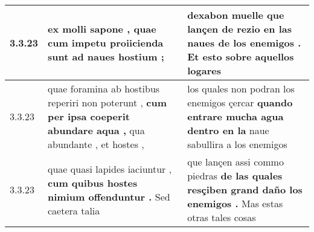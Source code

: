 \begin{tabular}{|p{1cm}|p{6.5cm}|p{6.5cm}|}
3.3.23 & ex molli sapone , \textbf{ quae cum impetu proiicienda sunt } ad naues hostium ; & dexabon muelle \textbf{ que lançen de rezio en las naues de los enemigos . } Et esto sobre aquellos logares \\\hline
3.3.23 & quae foramina ab hostibus reperiri non poterunt , \textbf{ cum per ipsa coeperit abundare aqua , } qua abundante , et hostes , & los quales non podran los enemigos çercar \textbf{ quando entrare mucha agua dentro en la } naue sabullira a los enemigos \\\hline
3.3.23 & quae quasi lapides iaciuntur , \textbf{ cum quibus hostes nimium offenduntur . } Sed caetera talia & que lançen assi commo piedras \textbf{ de las quales resçiben grand daño los enemigos . } Mas estas otras tales cosas \\\hline

\end{tabular}
